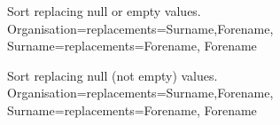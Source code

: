 \documentclass[12pt]{article}
\begin{document}
{%
Sort replacing null or empty values.
{
 Organisation={replacements={Surname,Forename}},
 Surname={replacements={Forename}},
 Forename
} 

} 

Sort replacing null (not empty) values.
{
 Organisation={replacements={Surname,Forename}},
 Surname={replacements={Forename}},
 Forename
} 

\end{document}
